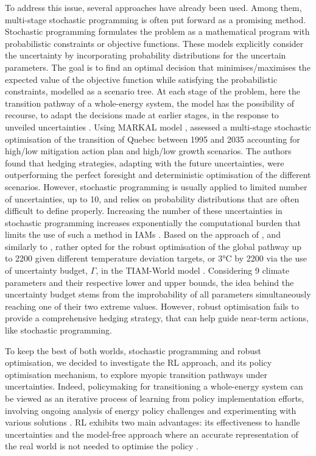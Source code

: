 To address this issue, several approaches have already been used. Among them,  multi-stage stochastic programming is often put forward as a promising method. Stochastic programming formulates the problem as a mathematical program with probabilistic constraints or objective functions. These models explicitly consider the uncertainty by incorporating probability distributions for the uncertain parameters. The goal is to find an optimal decision that minimises/maximises the expected value of the objective function while satisfying the probabilistic constraints, modelled as a scenario tree.  At each stage of the problem, here the transition pathway of a whole-energy system, the model has the possibility of recourse, \ie to adapt the decisions made at earlier stages, in the response to unveiled uncertainties \cite{grossmann2016recent}. Using MARKAL model \cite{fishbone1981markal}, \citet{kanudia1998robust} assessed a multi-stage stochastic optimisation of the transition of Quebec between 1995 and 2035 accounting for high/low mitigation action plan and high/low growth scenarios. The authors found that hedging strategies, adapting with the future uncertainties, were outperforming the perfect foresight and deterministic optimisation of the different scenarios. However, stochastic programming is usually applied to limited number of uncertainties, \ie up to 10, and relies on probability distributions that are often difficult to define properly. Increasing the number of these uncertainties in stochastic programming increases exponentially the computational burden that limits the use of such a method in \gls{IAMs} \cite{nicolas2021robust}. Based on the approach of \citet{bertsimas2004price}, and similarly to \citet{Moret2017PhDThesis}, \citet{nicolas2021robust} rather opted for the robust optimisation of the global pathway up to 2200 given different temperature deviation targets,  or 3°C by 2200 via the use of uncertainty budget, $\Gamma$, in the TIAM-World model \cite{loulou2005documentation}. Considering 9 climate parameters and their respective lower and upper bounds, the idea behind the uncertainty budget stems from the improbability of all parameters simultaneously reaching one of their two extreme values.  However, robust optimisation fails to provide a comprehensive hedging strategy, that can help guide near-term actions, like stochastic programming.

To keep the best of both worlds, \ie stochastic programming and robust optimisation, we decided to investigate the \gls{RL} approach, and its policy optimisation mechanism, to explore myopic transition pathways under uncertainties. Indeed, policymaking for transitioning a whole-energy system can be viewed as an iterative process of learning from policy implementation efforts, involving ongoing analysis of energy policy challenges and experimenting with various solutions \cite{howlett1995studying}. \gls{RL} exhibits two main advantages: its effectiveness to handle uncertainties and the model-free approach where an accurate representation of the real world is not needed to optimise the policy \cite{perera2021applications}. 

